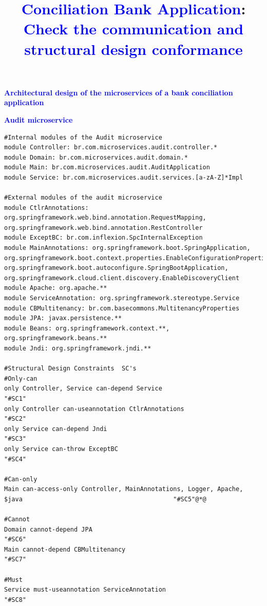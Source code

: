 \documentclass[12pt]{article}
\title{\textcolor{blue}{Conciliation Bank Application}:\\{\large \textcolor{blue}{Check the communication and structural design conformance}}}
\begin{document}
 

\maketitle


\vspace{-0.3cm}
\noindent\textbf{\large{\textcolor{blue}{Architectural design of the microservices of a bank conciliation application}}}
\label{sec:Estruturaltodos}

\noindent\textbf{\textcolor{blue}{Audit microservice}}
\label{sec:ApendiceAudit}

\vspace{-0.04cm}
\begin{lstlisting}[style=colorido, caption={\textcolor{blue}{Audit microservice's architectural project specification.}},label={list:especArquiteturalAudit}
]
#Internal modules of the Audit microservice
module Controller: br.com.microservices.audit.controller.*
module Domain: br.com.microservices.audit.domain.*
module Main: br.com.microservices.audit.AuditApplication
module Service: br.com.microservices.audit.services.[a-zA-Z]*Impl

#External modules of the audit microservice
module CtlrAnnotations:  org.springframework.web.bind.annotation.RequestMapping,  org.springframework.web.bind.annotation.RestController
module ExceptBC: br.com.inflexion.SpcInternalException
module MainAnnotations: org.springframework.boot.SpringApplication, org.springframework.boot.context.properties.EnableConfigurationProperties, org.springframework.boot.autoconfigure.SpringBootApplication, org.springframework.cloud.client.discovery.EnableDiscoveryClient
module Apache: org.apache.**
module ServiceAnnotation: org.springframework.stereotype.Service
module CBMultitenancy: br.com.basecommons.MultitenancyProperties
module JPA: javax.persistence.**
module Beans: org.springframework.context.**, org.springframework.beans.**
module Jndi: org.springframework.jndi.**

#Structural Design Constraints  SC's
#Only-can		
only Controller, Service can-depend Service																																							"#SC1"
only Controller can-useannotation CtlrAnnotations																																	"#SC2"
only Service can-depend Jndi																																																						"#SC3"
only Service can-throw ExceptBC																																																			"#SC4"

#Can-only
Main can-access-only Controller, MainAnnotations, Logger, Apache, $java											"#SC5"@*@

#Cannot
Domain cannot-depend JPA																																																										"#SC6"
Main cannot-depend CBMultitenancy																																																	"#SC7"

#Must 
Service must-useannotation ServiceAnnotation																																						"#SC8"
\end{lstlisting}
\end{document}
